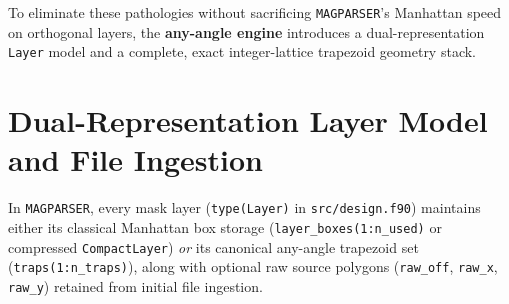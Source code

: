 To eliminate these pathologies without sacrificing \texttt{MAGPARSER}'s Manhattan speed on orthogonal layers, the \textbf{any-angle engine} introduces a dual-representation \texttt{Layer} model and a complete, exact integer-lattice trapezoid geometry stack.

\section{Dual-Representation Layer Model and File Ingestion}

In \texttt{MAGPARSER}, every mask layer (\texttt{type(Layer)} in \texttt{src/design.f90}) maintains either its classical Manhattan box storage (\texttt{layer\_boxes(1:n\_used)} or compressed \texttt{CompactLayer}) \emph{or} its canonical any-angle trapezoid set (\texttt{traps(1:n\_traps)}), along with optional raw source polygons (\texttt{raw\_off}, \texttt{raw\_x}, \texttt{raw\_y}) retained from initial file ingestion.

